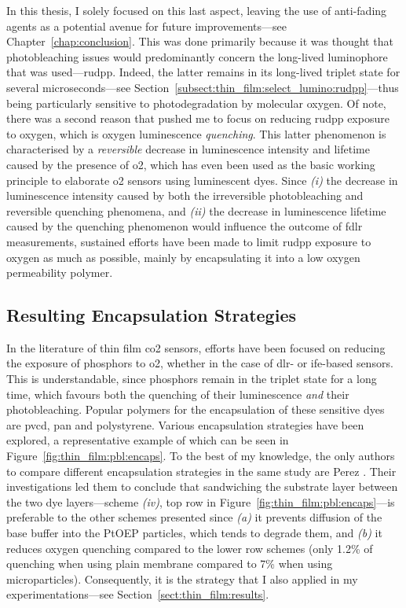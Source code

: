 In this thesis, I solely focused on this last aspect, leaving the use of anti-fading agents as a potential avenue for future improvements---see Chapter~\ref{chap:conclusion}. This was done primarily because it was thought that photobleaching issues would predominantly concern the long-lived luminophore that was used---\gls{rudpp}. Indeed, the latter remains in its long-lived triplet state for several microseconds---see Section~\ref{subsect:thin_film:select_lumino:rudpp}---thus being particularly sensitive to photodegradation by molecular oxygen. Of note, there was a second reason that pushed me to focus on reducing \gls{rudpp} exposure to oxygen, which is oxygen luminescence \emph{quenching}. This latter phenomenon is characterised by a \emph{reversible} decrease in luminescence intensity and lifetime caused by the presence of \gls{o2}\cite{cabrerizo2010}, which has even been used as the basic working principle to elaborate \gls{o2} sensors using luminescent dyes\cite{amao2003}. Since \textit{(i)} the decrease in luminescence intensity caused by both the irreversible photobleaching and reversible quenching phenomena, and \textit{(ii)} the decrease in luminescence lifetime caused by the quenching phenomenon would influence the outcome of \gls{fdlr} measurements, sustained efforts have been made to limit \gls{rudpp} exposure to oxygen as much as possible, mainly by encapsulating it into a low oxygen permeability polymer.

\subsection{Resulting Encapsulation Strategies}\label{subsect:thin_film:encaps:strategies}

In the literature of thin film \gls{co2} sensors, efforts have been focused on reducing the exposure of phosphors to \gls{o2}, whether in the case of \gls{dlr}- or \gls{ife}-based sensors\cite{bultzingslowen2002, burke2006, cajlakovic2006, fernandezramos2018, perez2009}. This is understandable, since phosphors remain in the triplet state for a long time, which favours both the quenching of their luminescence \emph{and} their photobleaching. Popular polymers for the encapsulation of these sensitive dyes are \gls{pvcd}\cite{perez2009, fernandezramos2018}, \gls{pan}\cite{cajlakovic2006, cajlakovic2009} and polystyrene\cite{pfeifer2020}. Various encapsulation strategies have been explored, a representative example of which can be seen in Figure~\ref{fig:thin_film:pbl:encaps}. To the best of my knowledge, the only authors to compare different encapsulation strategies in the same study are Perez \etal{}\cite{perez2009}. Their investigations led them to conclude that sandwiching the substrate layer between the two dye layers---scheme \textit{(iv)}, top row in Figure~\ref{fig:thin_film:pbl:encaps}---is preferable to the other schemes presented since \textit{(a)} it prevents diffusion of the base buffer into the PtOEP particles, which tends to degrade them, and \textit{(b)} it reduces oxygen quenching compared to the lower row schemes (only 1.2\% of quenching when using plain membrane compared to 7\% when using microparticles). Consequently, it is the strategy that I also applied in my experimentations---see Section~\ref{sect:thin_film:results}.


